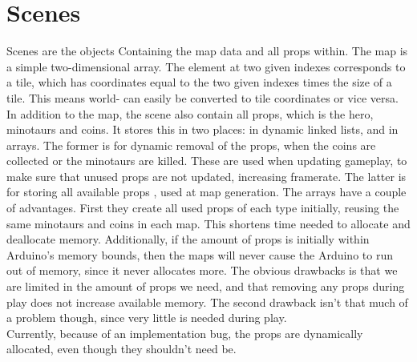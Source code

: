 \section{Scenes} %
Scenes are the objects Containing the map data and all props within. The map is a simple two-dimensional array. The element at two given indexes corresponds to a tile, which has coordinates equal to the two given indexes times the size of a tile. This means world- can easily be converted to tile coordinates or vice versa.\\
In addition to the map, the scene also contain all props, which is the hero, minotaurs and coins. It stores this in two places: in dynamic linked lists, and in arrays. The former is for dynamic removal of the props, when the coins are collected or the minotaurs are killed. These are used when updating gameplay, to make sure that unused props are not updated, increasing framerate. The latter is for storing all available props , used at map generation. The arrays have a couple of advantages. First they create all used props of each type initially, reusing the same minotaurs and coins in each map. This shortens time needed to allocate and deallocate memory. Additionally, if the amount of props is initially within Arduino's memory bounds, then the maps will never cause the Arduino to run out of memory, since it never allocates more. The obvious drawbacks is that we are limited in the amount of props we need, and that removing any props during play does not increase available memory. The second drawback isn't that much of a problem though, since very little is needed during play.\\
Currently, because of an implementation bug, the props are dynamically allocated, even though they shouldn't need be.

